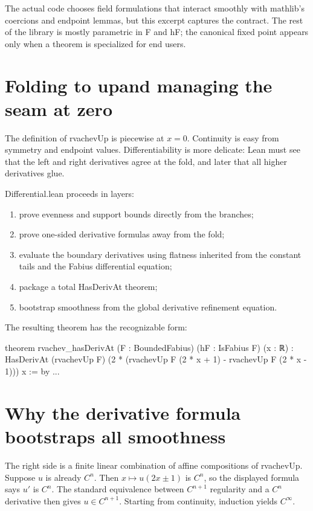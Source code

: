 \documentclass[11pt,a4paper,openany]{book}
\def\module#1{#1.lean}
\def\decl#1{#1}
\def\code#1{#1}
\def\upfun{up}
\newcommand{\upfun}{\ensuremath{\operatorname{up}}}
\newcommand{\module}[1]{\nolinkurl{#1.lean}}
\newcommand{\decl}[1]{\texttt{\detokenize{#1}}}
\newcommand{\code}[1]{\texttt{\detokenize{#1}}}
\begin{document}
The actual code chooses field formulations that interact smoothly with
mathlib's coercions and endpoint lemmas, but this excerpt captures the contract.
The rest of the library is mostly parametric in \code{F} and \code{hF}; the
canonical fixed point appears only when a theorem is specialized for end users.

\section{Folding to \upfun and managing the seam at zero}
The definition of \decl{rvachevUp} is piecewise at $x=0$.  Continuity is easy
from symmetry and endpoint values.  Differentiability is more delicate: Lean
must see that the left and right derivatives agree at the fold, and later that
all higher derivatives glue.

\module{Differential} proceeds in layers:
\begin{enumerate}
  \item prove evenness and support bounds directly from the branches;
  \item prove one-sided derivative formulas away from the fold;
  \item evaluate the boundary derivatives using flatness inherited from the
        constant tails and the Fabius differential equation;
  \item package a total \decl{HasDerivAt} theorem;
  \item bootstrap smoothness from the global derivative refinement equation.
\end{enumerate}

The resulting theorem has the recognizable form:

\begin{LeanCode}
theorem rvachev_hasDerivAt
    (F : BoundedFabius) (hF : IsFabius F) (x : ℝ) :
    HasDerivAt (rvachevUp F)
      (2 * (rvachevUp F (2 * x + 1) -
            rvachevUp F (2 * x - 1))) x := by
  ...
\end{LeanCode}

\section{Why the derivative formula bootstraps all smoothness}
The right side is a finite linear combination of affine compositions of
\decl{rvachevUp}.  Suppose $u$ is already $C^n$.  Then
$x\mapsto u(2x\pm1)$ is $C^n$, so the displayed formula says $u'$ is $C^n$.
The standard equivalence between $C^{n+1}$ regularity and a $C^n$ derivative
then gives $u\in C^{n+1}$.  Starting from continuity, induction yields
$C^\infty$.
\end{document}
